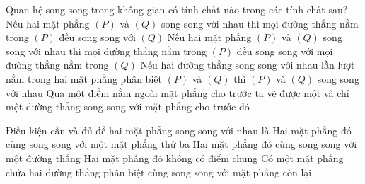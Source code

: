 \begin{ex}%
	Quan hệ song song trong không gian có tính chất nào trong  các tính chất sau?
	\choice 
		{\True Nếu hai mặt phẳng $(P)$ và $(Q)$ song song với nhau thì mọi đường  thẳng nằm trong $(P)$ đều song song với $(Q)$}
		{Nếu hai mặt phẳng $(P)$ và $(Q)$ song song với nhau thì mọi đường thẳng nằm trong $(P)$ đều song song với mọi đường  thẳng nằm trong $(Q)$}
		{Nếu hai đường thẳng song song với  nhau lần lượt nằm trong hai mặt phẳng phân biệt $(P)$ và $(Q)$ thì $(P)$ và $(Q)$ song song với nhau}
		{Qua  một điểm nằm ngoài mặt phẳng cho trước ta vẽ được một và chỉ một đường thẳng song song với mặt phẳng cho trước đó}
\end{ex}

\begin{ex}%
	Điều kiện cần và đủ để hai mặt  phẳng song song với nhau là
	 \choice
		 {Hai mặt phẳng đó cùng song song với một mặt phẳng thứ ba}
		{Hai mặt  phẳng đó cùng song song với một đường thẳng}
		{\True Hai mặt phẳng  đó không có điểm chung}
		{Có một mặt  phẳng chứa hai đường thẳng phân biệt cùng song song với mặt phẳng còn lại}
\end{ex}

